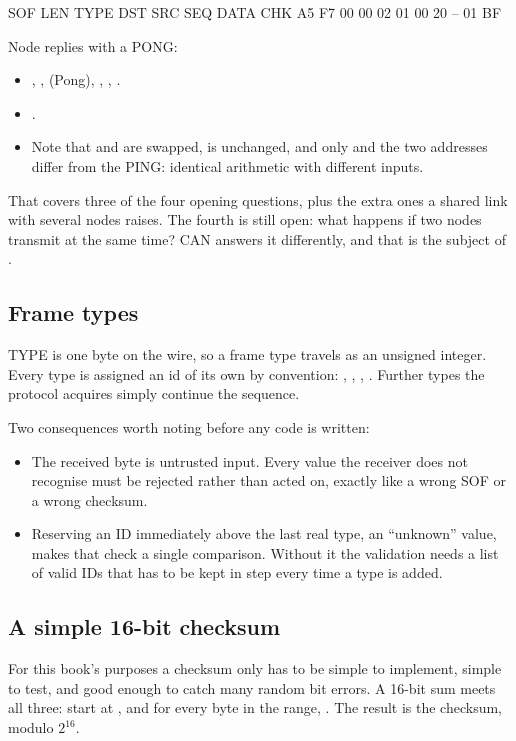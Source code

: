 \begin{textdrawing}
SOF      LEN   TYPE   DST   SRC   SEQ      DATA   CHK
A5 F7    00    00     02    01    00 20    --     01 BF
\end{textdrawing}

Node  replies with a PONG:
\begin{itemize}
  \item {}, ,  (Pong), ,
    , .
  \item {}.
  \item Note that  and  are swapped,  is unchanged, and only
     and the two addresses differ from the PING: identical arithmetic with different
    inputs.
\end{itemize}

That covers three of the four opening questions, plus the extra ones a shared link with several
nodes raises. The fourth is still open: what happens if two nodes transmit at the same time? CAN
answers it differently, and that is the subject of .

\subsection*{Frame types}
TYPE is one byte on the wire, so a frame type travels as an unsigned integer. Every type is assigned
an id of its own by convention: , , ,
. Further types the protocol acquires simply continue the sequence.

Two consequences worth noting before any code is written:
\begin{itemize}
  \item The received byte is untrusted input. Every value the receiver does not recognise must be
    rejected rather than acted on, exactly like a wrong SOF or a wrong checksum.
  \item Reserving an ID immediately above the last real type, an ``unknown'' value, makes that check
    a single comparison. Without it the validation needs a list of valid IDs that has to be kept in
    step every time a type is added.
\end{itemize}

\subsection*{A simple 16-bit checksum}
For this book's purposes a checksum only has to be simple to implement, simple to test, and good
enough to catch many random bit errors. A 16-bit sum meets all three: start at , and for
every byte in the range, . The result is the checksum, modulo $2^{16}$.

